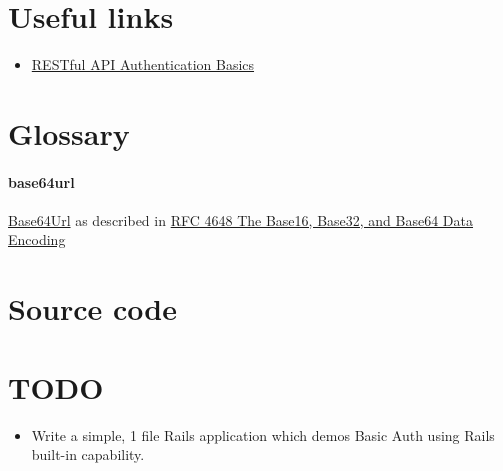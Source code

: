 \documentclass{article}
\begin{document}
\section{Useful links}

\begin{itemize}
  \item \href{https://blog.restcase.com/restful-api-authentication-basics/}{%
      RESTful API Authentication Basics}
\end{itemize}


\appendix

\section{Glossary}

\paragraph{base64url} \href{https://en.wikipedia.org/wiki/Base64#URL_applications}{%
  Base64Url} as described in \href{https://tools.ietf.org/html/rfc4648}{%
    RFC 4648 The Base16, Base32, and Base64 Data Encoding}

\section{Source code}

\section{TODO}

\begin{itemize}
  \item Write a simple, 1 file Rails application which demos Basic Auth
    using Rails built-in capability.
\end{itemize}
\end{document}
